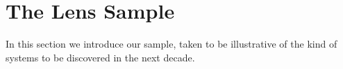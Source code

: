 \documentclass[a4paper,11pt]{article}
\begin{document}


\section{The Lens Sample}

In this section we introduce our sample, taken to be illustrative of the kind of systems to be discovered in the next decade.
\end{document}
